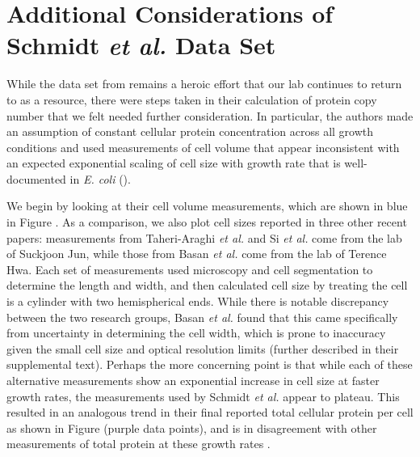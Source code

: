 \section{Additional Considerations of Schmidt \textit{et al.} Data Set}
\label{sec:SI_schmidt}

While the data set from \cite{schmidt_2016} remains a heroic effort that our
lab continues to return to as a resource, there were steps taken in their
calculation of protein copy number that we felt needed further
consideration. In particular, the authors made an assumption of constant
cellular protein concentration across all growth conditions and used
measurements of cell volume that appear inconsistent with an expected
exponential scaling of cell size with growth rate that is well-documented in
\textit{E. coli} (\cite{schaechter1958, taheriaraghi2015, si2017}).

We begin by looking at their cell volume measurements, which are shown in blue
in Figure . As a comparison, we also plot cell sizes
reported in three other recent papers: measurements from Taheri-Araghi
\textit{et al.} and Si \textit{et al.} come from the lab of Suckjoon Jun, while
those from Basan \textit{et al.} come  from the lab of Terence Hwa.  Each set of
measurements used microscopy and cell segmentation to determine the length and
width, and then calculated cell size by treating the cell is a cylinder with two
hemispherical ends. While there is notable discrepancy between the two research
groups, Basan \textit{et al.} found that this came specifically from uncertainty
in determining the cell width, which is prone to inaccuracy given the small cell
size and optical resolution limits (further described in their supplemental
text). Perhaps the more concerning point is that while each of these alternative
measurements show an exponential increase in  cell size at faster growth rates,
the measurements used by Schmidt \textit{et al.} appear to plateau. This
resulted in an analogous trend in their final reported total cellular protein
per cell as shown in Figure  (purple data
points), and is in disagreement with other measurements of total protein at
these growth rates \citep{basan2015}.

